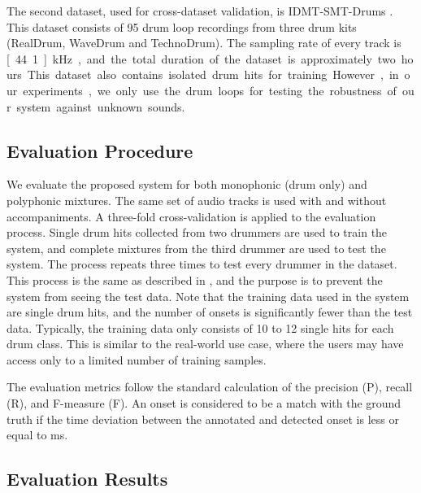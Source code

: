 \documentclass{article}
\begin{document}
The second dataset, used for cross-dataset validation, is IDMT-SMT-Drums \cite{Dittmar2014}. This dataset consists of 95 drum loop recordings from three drum kits (RealDrum, WaveDrum and TechnoDrum). The sampling rate of every track is \unit[44.1]{kHz}, and the total duration of the dataset is approximately two hours. This dataset also contains isolated drum hits for training. However, in our experiments, we only use the drum loops for testing the robustness of our system against unknown sounds.   

\subsection{Evaluation Procedure}\label{subsec:evaluation procedure}
We evaluate the proposed system for both monophonic (drum only) and polyphonic mixtures. The same set of audio tracks is used with and without accompaniments. A three-fold cross-validation is applied to the evaluation process. Single drum hits collected from two drummers are used to train the system, and complete mixtures from the third drummer are used to test the system. The process repeats three times to test every drummer in the dataset. This process is the same as described in \cite{Paulus2009a}, and the purpose is to prevent the system from seeing the test data. Note that the training data used in the system are single drum hits, and the number of onsets is significantly fewer than the test data. Typically, the training data only consists of 10 to 12 single hits for each drum class. This is similar to the real-world use case, where the users may have access only to a limited number of training samples. 

The evaluation metrics follow the standard calculation of the precision (P), recall (R), and F-measure (F). An onset is considered to be a match with the ground truth if the time deviation between the annotated and detected onset is less or equal to \unit[50]{ms}.  

\subsection{Evaluation Results}\label{subsec:evaluation results}
\end{document}
